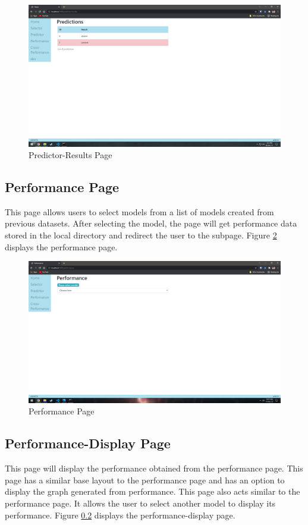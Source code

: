 \begin{figure}[H]
    \centering
    \includegraphics[width=0.7\columnwidth]{media/website/pages/03_predictor_results.png}
    \caption{Predictor-Results Page}
    \label{fig:web_predictor_results_page}
\end{figure}

\subsection{Performance Page} \label{subsec:performance_page}
This page allows users to select models from a list of models created from previous datasets.
After selecting the model, the page will get performance data stored in the local directory and
redirect the user to the subpage. Figure \ref{fig:web_performance_page} displays the
performance page.

\begin{figure}[H]
    \centering
    \includegraphics[width=0.7\columnwidth]{media/website/pages/04_Performance.png}
    \caption{Performance Page}
    \label{fig:web_performance_page}
\end{figure}

\subsection{Performance-Display Page} \label{subsec:performance_display_page}
This page will display the performance obtained from the performance page. This page has a
similar base layout to the performance page and has an option to display the graph generated
from performance. This page also acts similar to the performance page. It allows the user to
select another model to display its performance. Figure \ref{subsec:performance_display_page}
displays the performance-display page.

